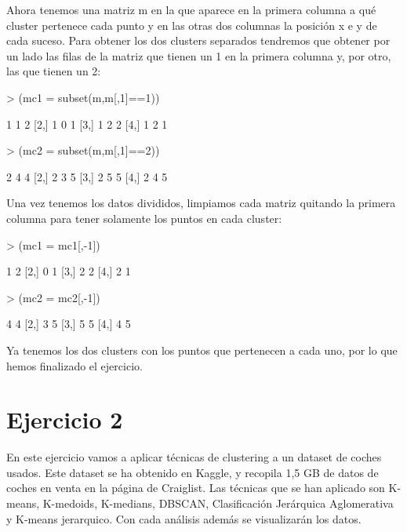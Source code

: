 \documentclass[a4paper]{article}
\begin{document}
Ahora tenemos una matriz m en la que aparece en la primera columna a qué cluster pertenece cada punto y en las otras dos columnas la posición x e y de cada suceso. Para obtener los dos clusters separados tendremos que obtener por un lado las filas de la matriz que tienen un 1 en la primera columna y, por otro, las que tienen un 2:

\begin{Schunk}
\begin{Sinput}
> (mc1 = subset(m,m[,1]==1))
\end{Sinput}
\begin{Soutput}
     [,1] [,2] [,3]
[1,]    1    1    2
[2,]    1    0    1
[3,]    1    2    2
[4,]    1    2    1
\end{Soutput}
\begin{Sinput}
> (mc2 = subset(m,m[,1]==2))
\end{Sinput}
\begin{Soutput}
     [,1] [,2] [,3]
[1,]    2    4    4
[2,]    2    3    5
[3,]    2    5    5
[4,]    2    4    5
\end{Soutput}
\end{Schunk}

Una vez tenemos los datos divididos, limpiamos cada matriz quitando la primera columna para tener solamente los puntos en cada cluster:

\begin{Schunk}
\begin{Sinput}
> (mc1 = mc1[,-1])
\end{Sinput}
\begin{Soutput}
     [,1] [,2]
[1,]    1    2
[2,]    0    1
[3,]    2    2
[4,]    2    1
\end{Soutput}
\begin{Sinput}
> (mc2 = mc2[,-1])
\end{Sinput}
\begin{Soutput}
     [,1] [,2]
[1,]    4    4
[2,]    3    5
[3,]    5    5
[4,]    4    5
\end{Soutput}
\end{Schunk}

Ya tenemos los dos clusters con los puntos que pertenecen a cada uno, por lo que hemos finalizado el ejercicio.

\section{Ejercicio 2}
En este ejercicio vamos a aplicar técnicas de clustering a un dataset de coches usados. Este dataset se ha obtenido en Kaggle, y recopila 1,5 GB de datos de coches en venta en la página de Craiglist. Las técnicas que se han aplicado son K-means, K-medoids, K-medians, DBSCAN, Clasificación Jerárquica Aglomerativa y K-means jerarquico. Con cada análisis además se visualizarán los datos.
\end{document}
